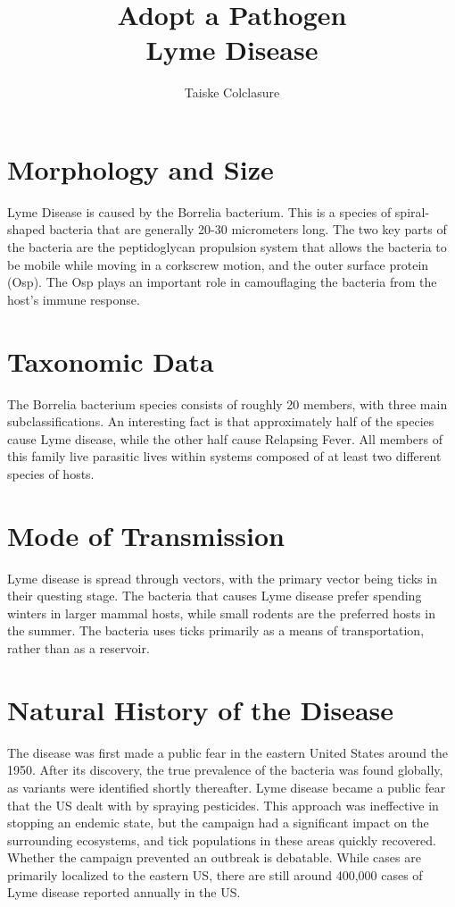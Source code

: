 \documentclass{report}
\title{\Huge{Adopt a Pathogen}\\Lyme Disease}
\author{\huge{Taiske Colclasure}}
\date{}
\begin{document}
\maketitle
\newpage%
\tableofcontents
\pagebreak

\section{Morphology and Size}
Lyme Disease is caused by the Borrelia bacterium. This is a species of spiral-shaped bacteria that are generally 20-30 micrometers long. The two key parts of the bacteria are the peptidoglycan propulsion system that allows the bacteria to be mobile while moving in a corkscrew motion, and the outer surface protein (Osp). The Osp plays an important role in camouflaging the bacteria from the host's immune response.

\section{Taxonomic Data}
The Borrelia bacterium species consists of roughly 20 members, with three main subclassifications. An interesting fact is that approximately half of the species cause Lyme disease, while the other half cause Relapsing Fever. All members of this family live parasitic lives within systems composed of at least two different species of hosts.

\section{Mode of Transmission}
Lyme disease is spread through vectors, with the primary vector being ticks in their questing stage. The bacteria that causes Lyme disease prefer spending winters in larger mammal hosts, while small rodents are the preferred hosts in the summer. The bacteria uses ticks primarily as a means of transportation, rather than as a reservoir.

\section{Natural History of the Disease}
The disease was first made a public fear in the eastern United States around the 1950. After its discovery, the true prevalence of the bacteria was found globally, as variants were identified shortly thereafter. Lyme disease became a public fear that the US dealt with by spraying pesticides. This approach was ineffective in stopping an endemic state, but the campaign had a significant impact on the surrounding ecosystems, and tick populations in these areas quickly recovered. Whether the campaign prevented an outbreak is debatable. While cases are primarily localized to the eastern US, there are still around 400,000 cases of Lyme disease reported annually in the US.
\end{document}
